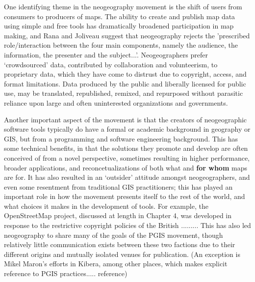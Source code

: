 \documentclass[11pt]{report}
\begin{document}
One identifying theme in the neogeography movement is the shift of users from consumers to producers of maps. \cite{oconnor2008maps} The ability to create and publish map data using simple and free tools has dramatically broadened participation in map making, and Rana and Joliveau suggest that neogeography rejects the 'prescribed role/interaction between the four main components, namely the audience, the information, the presenter and the subject...'. \cite{rana2009neogeography} Neogeographers prefer `crowdsourced' data, contributed by collaboration and volunteerism, to proprietary data, which they have come to distrust due to copyright, access, and format limitations. Data produced by the public and liberally licensed for public use, may be translated, republished, remixed, and repurposed without parasitic reliance upon large and often uninterested organizations and governments. 

Another important aspect of the movement is that the creators of neogeographic software tools typically do have a formal or academic background in geography or GIS, but from a programming and software engineering background. This has some technical benefits, in that the solutions they promote and develop are often conceived of from a novel perspective, sometimes resulting in higher performance, broader applications, and reconcetualizations of both what and \textbf{for whom} maps are for. It has also resulted in an `outsider' attitude amongst neogeographers, and even some resentment from traditional GIS practitioners; this has played an important role in how the movement presents itself to the rest of the world, and what choices it makes in the development of tools. For example, the OpenStreetMap project, discussed at length in Chapter 4, was developed in response to the restrictive copyright policies of the British ......... This has also led neogeography to share many of the goals of the PGIS movement, though relatively little communication exists between these two factions due to their different origins and mutually isolated venues for publication. (An exception is Mikel Maron's efforts in Kibera, among other places, which makes explicit reference to PGIS practices..... reference)



\end{document}
